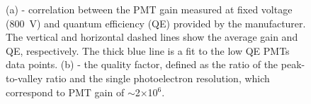 

\begin{figure}[!h]
\centering
{}
\caption[Correlation between the PMT gain measured at fixed voltage and quantum efficiency provided by the manufacturer, and the PMT test quality factor]{(a) - correlation between the PMT gain measured at fixed voltage (800~V) and quantum efficiency (QE) provided by the manufacturer. The vertical and horizontal dashed lines show the average gain and QE, respectively. The thick blue line is a fit to the low QE PMTs data points. (b) - the quality factor, defined as the ratio of the peak-to-valley ratio and the single photoelectron resolution, which correspond to PMT gain of $\sim$2$\times$10$^{6}$.}
\label{figPMTtestCorrelation}
\end{figure}


